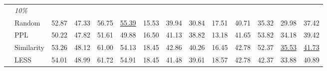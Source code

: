 \begin{adjustbox}{max width=1.0\textwidth}
\begin{tabular}{llcccccccccccc}
                                                    & \textit{10\%}                                      &                                   &                                   &                                   &                                      &                                  &                                   &                                   &                                   &                                   &                                   &                                      &                                      \\
                                                    & Random                                             & 52.87                             & 47.33                             & 56.75                             & \underline{55.39}                                & 15.53                            & 39.94                             & 30.84                             & 17.51                             & 40.71                             & 35.32                             & 29.98                                & 37.42                                \\
                                                    & PPL                                                & 50.22                             & 47.82                             & 51.61                             & 49.88                                & 16.50                            & 41.13                             & 38.82                             & 13.18                             & 41.65                             & 53.82                             & 34.18                                & 39.42                                \\
                                                    & Similarity                                         & 53.26                             & 48.12                             & 61.00                             & 54.13                                & 18.45                            & 42.86                             & 40.26                             & 16.45                             & 42.78                             & 52.37                             & \underline{35.53}                                & \underline{41.73}                                \\
                                                    & LESS                                               & 54.01                             & 48.99                             & 61.72                             & 54.91                                & 18.45                            & 41.48                             & 39.61                             & 18.57                             & 42.78                             & 42.37                             & 33.88                                & 40.89                                \\

\end{tabular}
\end{adjustbox}
